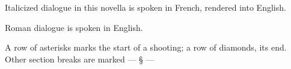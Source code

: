 \documentclass[12pt, twoside, openright]{book}
\begin{document}
\thispagestyle{empty}
\null
\vfill
\begin{center}
	\begin{minipage}{0.75\textwidth}
		\centering
		Italicized dialogue in this novella is spoken in French, rendered into English.
		
		\bigskip
		
		Roman dialogue is spoken in English.
		
		\bigskip
		
		A row of asterisks marks the start of a shooting; a row of diamonds, its end. Other section breaks are marked --- § ---
		
	\end{minipage}
\end{center}
\vfill
\null
\clearpage
	
	\mainmatter
	
	
	
	


	\backmatter
	
\end{document}
